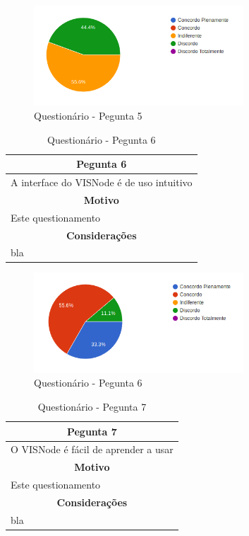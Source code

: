 \documentclass[
	12pt,				%
	oneside,			%
	a4paper,			%
	english,			%
	french,				%
	spanish,			%
	brazil,				%
	]{abntex2}
\begin{document}
\begin{figure}[H]
\centering
\caption{Questionário - Pegunta 5}
\includegraphics[width=0.7\textwidth]{imagens/v1/p5.png}
\sourceAuthor
\end{figure}

\begin{table}[H]
\centering
\caption{Questionário - Pegunta 6} 
\def\arraystretch{1.5}
\begin{tabular}{l}
\hline
\multicolumn{1}{c}{\textbf{Pegunta 6}}              \\ \hline
A interface do VISNode é de uso intuitivo \\ \hline
\multicolumn{1}{c}{\textbf{Motivo}}                 \\ \hline
Este questionamento                                   \\ \hline
\multicolumn{1}{c}{\textbf{Considerações}}          \\ \hline
bla                                                   \\ \hline
\end{tabular}
\sourceAuthor
\end{table}

\begin{figure}[H]
\centering
\caption{Questionário - Pegunta 6}
\includegraphics[width=0.7\textwidth]{imagens/v1/p6.png}
\sourceAuthor
\end{figure}

\begin{table}[H]
\centering
\caption{Questionário - Pegunta 7} 
\def\arraystretch{1.5}
\begin{tabular}{l}
\hline
\multicolumn{1}{c}{\textbf{Pegunta 7}}              \\ \hline
O VISNode é fácil de aprender a usar          \\ \hline
\multicolumn{1}{c}{\textbf{Motivo}}                 \\ \hline
Este questionamento                                   \\ \hline
\multicolumn{1}{c}{\textbf{Considerações}}          \\ \hline
bla                                                   \\ \hline
\end{tabular}
\sourceAuthor
\end{table}
\end{document}
